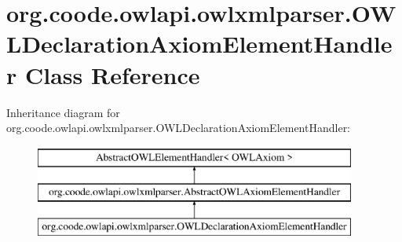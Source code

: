 \hypertarget{classorg_1_1coode_1_1owlapi_1_1owlxmlparser_1_1_o_w_l_declaration_axiom_element_handler}{\section{org.\-coode.\-owlapi.\-owlxmlparser.\-O\-W\-L\-Declaration\-Axiom\-Element\-Handler Class Reference}
\label{classorg_1_1coode_1_1owlapi_1_1owlxmlparser_1_1_o_w_l_declaration_axiom_element_handler}
}
Inheritance diagram for org.\-coode.\-owlapi.\-owlxmlparser.\-O\-W\-L\-Declaration\-Axiom\-Element\-Handler\-:\begin{figure}[H]
\begin{center}
\leavevmode
\includegraphics[height=3.000000cm]{classorg_1_1coode_1_1owlapi_1_1owlxmlparser_1_1_o_w_l_declaration_axiom_element_handler}
\end{center}
\end{figure}
